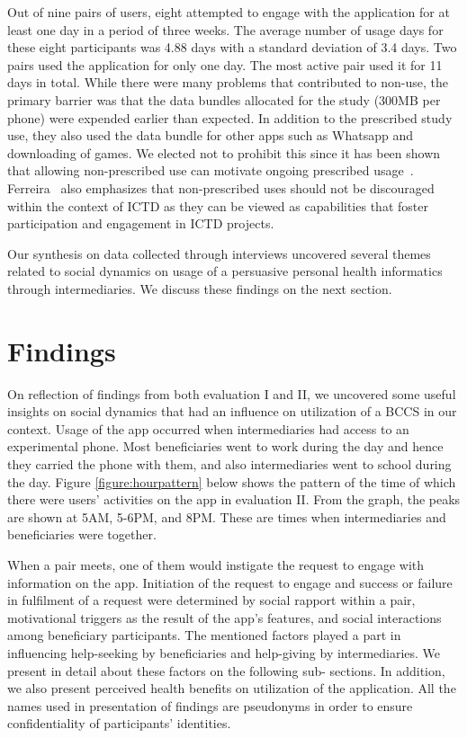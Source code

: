 \documentclass{sig-alternate}
\begin{document}
Out of nine pairs of users, eight attempted to engage with the application for
at least one day in a period of three weeks. The average number of usage days
for these eight participants was 4.88 days with a standard deviation of  3.4
days. Two pairs used the application for only one day. The most active pair
used it for 11 days in total. 
While there were many problems that contributed to non-use, the primary barrier
was that the data bundles allocated for the study (300MB per phone) were 
expended earlier than expected.
In addition to the prescribed study use, they also used the
data bundle for other apps such as Whatsapp and downloading of games. We 
elected not to prohibit this since it has been shown that allowing non-prescribed
use can motivate ongoing prescribed usage~\cite{Schwartz2013}.
Ferreira~\cite{ferrplay2015} also emphasizes that non-prescribed uses should not be
discouraged within the context of ICTD as they can be viewed as  capabilities
that foster participation and engagement in ICTD projects.

Our synthesis on data collected through interviews uncovered several themes
related to social dynamics on usage of a persuasive personal health
informatics through intermediaries. We discuss these findings on the next
section.

\section{Findings}

On reflection of findings from both evaluation I and II,  we uncovered some
useful insights on social dynamics that had an influence on utilization of a
BCCS in our context. Usage of the app occurred when intermediaries had access
to an experimental phone. Most beneficiaries went to work during the day and
hence they carried the phone with them, and  also intermediaries went to
school during the day. Figure \ref{figure:hourpattern} below shows the pattern
of the time of which there were users' activities on the app in evaluation II.
From the graph, the peaks are shown at 5AM, 5-6PM, and 8PM. These are times
when intermediaries and beneficiaries were together.

When a pair meets, one of them would instigate the request to engage with
information on the app. Initiation of the request to engage and success or
failure in fulfilment of a request were determined by social rapport within a
pair, motivational triggers as the result of the app's features, and social
interactions among beneficiary participants. The mentioned factors played a
part in influencing help-seeking by beneficiaries and help-giving by
intermediaries. We present in detail about these factors on the following sub-
sections. In addition, we also present perceived health benefits on
utilization of the application. All the names used in presentation of findings
are pseudonyms in order to ensure confidentiality of participants' identities.
\end{document}
